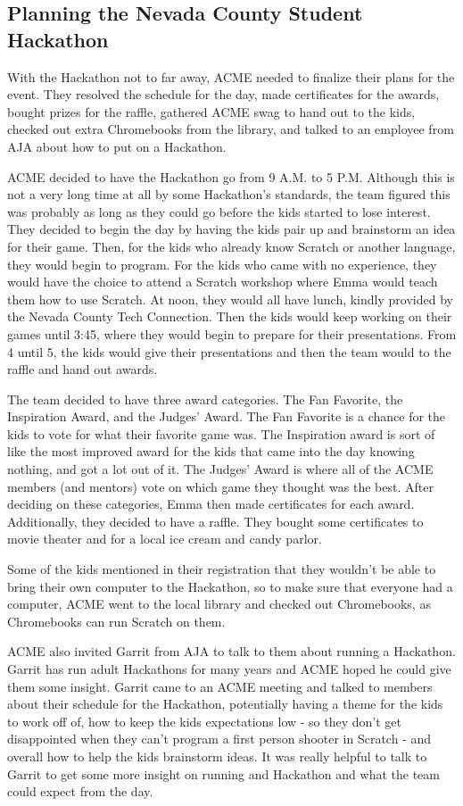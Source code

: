 \documentclass{article}
\begin{document}
\subsection{Planning the Nevada County Student Hackathon}
With the Hackathon not to far away, ACME needed to finalize their plans for the event. They resolved the schedule for the day, made certificates for the awards, bought prizes for the raffle, gathered ACME swag to hand out to the kids, checked out extra Chromebooks from the library, and talked to an employee from AJA about how to put on a Hackathon. 

ACME decided to have the Hackathon go from 9 A.M. to 5 P.M. Although this is not a very long time at all by some Hackathon's standards, the team figured this was probably as long as they could go before the kids started to lose interest. They decided to begin the day by having the kids pair up and brainstorm an idea for their game. Then, for the kids who already know Scratch or another language, they would begin to program. For the kids who came with no experience, they would have the choice to attend a Scratch workshop where Emma would teach them how to use Scratch. At noon, they would all have lunch, kindly provided by the Nevada County Tech Connection. Then the kids would keep working on their games until 3:45, where they would begin to prepare for their presentations. From 4 until 5, the kids would give their presentations and then the team would to the raffle and hand out awards. 

The team decided to have three award categories. The Fan Favorite, the Inspiration Award, and the Judges' Award. The Fan Favorite is a chance for the kids to vote for what their favorite game was. The Inspiration award is sort of like the most improved award for the kids that came into the day knowing nothing, and got a lot out of it. The Judges' Award is where all of the ACME members (and mentors) vote on which game they thought was the best. After deciding on these categories, Emma then made certificates for each award. Additionally, they decided to have a raffle. They bought some certificates to movie theater and for a local ice cream and candy parlor. 

Some of the kids mentioned in their registration that they wouldn't be able to bring their own computer to the Hackathon, so to make sure that everyone had a computer, ACME went to the local library and checked out Chromebooks, as Chromebooks can run Scratch on them. 

ACME also invited Garrit from AJA to talk to them about running a Hackathon. Garrit has run adult Hackathons for many years and ACME hoped he could give them some insight. Garrit came to an ACME meeting and talked to members about their schedule for the Hackathon, potentially having a theme for the kids to work off of, how to keep the kids expectations low - so they don't get disappointed when they can't program a first person shooter in Scratch - and overall how to help the kids brainstorm ideas. It was really helpful to talk to Garrit to get some more insight on running and Hackathon and what the team could expect from the day. 
\end{document}
